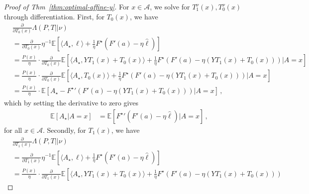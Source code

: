 \documentclass{article}
\theoremstyle{plain}
\theoremstyle{definition}
\newcommand{\E}{\mathbb E}
\newcommand{\cA}{\mathcal A}
\newcommand{\hl}{\hat{\ell}\xspace}
\begin{document}
\begin{proof}[Proof of Thm~\ref{thm:optimal-affine-y}]
    For $x \in \cA$, we solve for $T_1^\nu(x), T_0^\nu(x)$ through differentiation.
    First, for $T_0(x)$, we have
    \begin{align*}
         & \tfrac{\partial}{\partial T_0(x)} \Lambda(P, T||\nu)
        \\
         & =
        \tfrac{\partial}{\partial T_0(x)}
        \eta^{-1}
        \E\!\left[
            \langle A_\star, \hl \rangle
            + \frac{1}{\eta} F^\star\left(F'(a) - \eta \hl\right)
            \right]
        \\
         & =
        \tfrac{P(x)}{\eta} \cdot
        \tfrac{\partial}{\partial T_0(x)}
        \E\!\left[
            \langle A_\star, Y T_1(x) + T_0(x) \rangle
            + \frac{1}{\eta} F^\star\left(F'(a) - \eta (Y T_1(x) + T_0(x))\right)
            | A = x
            \right]
        \\
         & =
        \tfrac{P(x)}{\eta} \cdot
        \tfrac{\partial}{\partial T_0(x)}
        \E\!\left[
            \langle A_\star, T_0(x) \rangle
            + \frac{1}{\eta} F^\star\left(F'(a) - \eta (Y T_1(x) + T_0(x))\right)
            | A = x
            \right]
        \\
         & =
        \tfrac{P(x)}{\eta} \cdot
        \E\!\left[
        A_\star
        - {F^\star}'\left(F'(a) - \eta (Y T_1(x) + T_0(x))\right)
        | A = x
        \right]\,,
    \end{align*}
    which by setting the derivative to zero gives
    \begin{align}
        \E\!\left[
            A_\star
            | A = x
            \right]
         & =
        \E\!\left[
            {F^\star}'\left(F'(a) - \eta \hl \right)
            | A = x
            \right]\,,
        \label{eq:t0-optimal}
    \end{align}
    for all $x \in \cA$.
    Secondly, for $T_1(x)$, we have
    \begin{align*}
         & \tfrac{\partial}{\partial T_1(x)} \Lambda(P, T||\nu)
        \\
         & =
        \tfrac{\partial}{\partial T_1(x)}
        \eta^{-1}
        \E\!\left[
            \langle A_\star, \hl \rangle
            + \frac{1}{\eta} F^\star\left(F'(a) - \eta \hl\right)
            \right]
        \\
         & =
        \tfrac{P(x)}{\eta} \cdot
        \tfrac{\partial}{\partial T_1(x)}
        \E\!\left[
            \langle A_\star, Y T_1(x) + T_0(x) \rangle
            + \frac{1}{\eta} F^\star\left(F'(a) - \eta (Y T_1(x) + T_0(x))\right)

\end{align*}
\end{proof}
\end{document}
